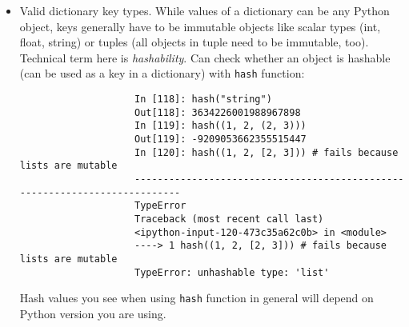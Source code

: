 \documentclass{article}
\begin{document}
\begin{itemize}
\begin{itemize}
\begin{itemize}
\begin{itemize}
\begin{verbatim}
				\end{verbatim}
				\item {\sf Valid dictionary key types.} While values of a dictionary can be any Python object, keys generally have to be immutable objects like scalar types (int, float, string) or tuples (all objects in tuple need to be immutable, too). Technical term here is {\it hashability}. Can check whether an object is hashable (can be used as a key in a dictionary) with {\tt hash} function:
				\begin{verbatim}
					In [118]: hash("string")
					Out[118]: 3634226001988967898
					In [119]: hash((1, 2, (2, 3)))
					Out[119]: -9209053662355515447
					In [120]: hash((1, 2, [2, 3])) # fails because lists are mutable
					---------------------------------------------------------------------------
					TypeError
					Traceback (most recent call last)
					<ipython-input-120-473c35a62c0b> in <module>
					----> 1 hash((1, 2, [2, 3])) # fails because lists are mutable
					TypeError: unhashable type: 'list'
				\end{verbatim}
				Hash values you see when using {\tt hash} function in general will depend on Python version you are using.
				

\end{itemize}
\end{itemize}
\end{itemize}
\end{itemize}
\end{document}
